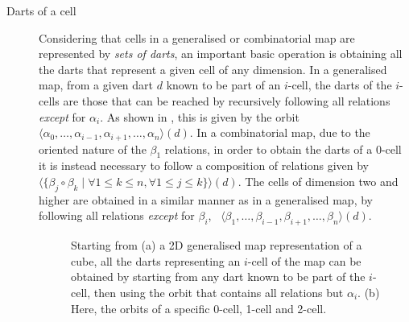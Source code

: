 \begin{description}

\item[Darts of a cell]
Considering that cells in a generalised or combinatorial map are represented by \emph{sets of darts}, an important basic operation is obtaining all the darts that represent a given cell of any dimension.
In a generalised map, from a given dart $d$ known to be part of an $i$-cell, the darts of the $i$-cells are those that can be reached by recursively following all relations \emph{except} for $\alpha_i$.
As shown in , this is given by the orbit $\langle\alpha_0, \ldots, \alpha_{i-1}, \alpha_{i+1}, \ldots, \alpha_n\rangle(d)$.
In a combinatorial map, due to the oriented nature of the $\beta_1$ relations, in order to obtain the darts of a $0$-cell it is instead necessary to follow a composition of relations given by $\langle \{\beta_j\circ \beta_k \mid \forall 1 \leq k \leq n, \forall 1 \leq j \leq k\} \rangle(d)$.
The cells of dimension two and higher are obtained in a similar manner as in a generalised map, by following all relations \emph{except} for $\beta_i$, \ie\ $\langle\beta_1, \ldots, \beta_{i-1}, \beta_{i+1}, \ldots, \beta_n\rangle(d)$.
\begin{figure}[tbp]
\centering
{}
\quad
{}
\caption[Darts of a cell]{Starting from (a) a 2D generalised map representation of a cube, all the darts representing an $i$-cell of the map can be obtained by starting from any dart known to be part of the $i$-cell, then using the orbit that contains all relations but $\alpha_i$. (b) Here, the orbits of a specific 0-cell, 1-cell and 2-cell.}
\label{fig:darts-of-cell}
\end{figure}


\end{description}
